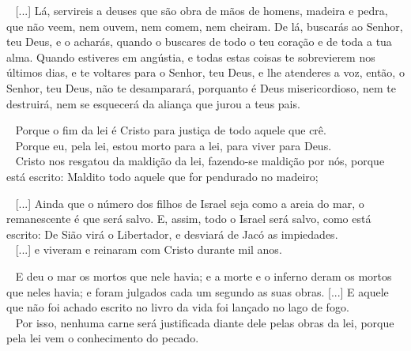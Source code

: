 \documentclass[12pt,aspectratio=169]{beamer}
\newcommand{\ver}[1]{%
    \raisebox{0.50ex}{%
        \scalebox{1.1}{%
            \pmb{\textbf{\textcolor{BSpbg}{#1}}}%
        }%
    }%
}
\newcommand{\QUOTE}[1]{%
    \par\noindent\hspace*{0.1\linewidth}%
    \begin{minipage}{0.8\linewidth}%
        \linespread{1.35}\large{#1}%
    \end{minipage}%
}
\newcommand{\WIDEQUOTE}[1]{%
    \par\noindent\hspace*{0.02\linewidth}%
    \begin{minipage}{0.92\linewidth}%
        \linespread{1.25}\large{#1}%
    \end{minipage}%
}
\newcommand{\RED}[1]{{\textcolor{TXred}{#1}}}
\newcommand{\YEL}[1]{{\textcolor{TXyel}{#1}}}
\newcommand{\GRE}[1]{{\textcolor{TXgre}{#1}}}
\newcommand{\CYA}[1]{{\textcolor{TXcya}{#1}}}
\newcommand{\MAG}[1]{{\textcolor{TXmag}{#1}}}
\newcommand{\BRI}[1]{{\textcolor{BSpbg}{#1}}}   %
\begin{document}
    \begin{frame}
        \WIDEQUOTE{%
            \ver{(ARC) Dt~4.25--31}~%
            [...] Lá, \RED{servireis a deuses que são obra de  mãos  de  homens,  madeira  e
            pedra}, que não veem, nem ouvem, nem comem, nem cheiram. \CYA{De lá, buscarás ao
            Senhor, teu Deus}, e \GRE{o acharás, quando o buscares de todo o teu  coração  e
            de toda a tua alma}. Quando estiveres \BRI{em angústia, e todas estas coisas  te
            sobrevierem} \MAG{nos últimos dias}, e te \CYA{voltares para o Senhor, teu Deus,
            e lhe atenderes a voz}, então, \GRE{o Senhor,  teu  Deus,  não  te  desamparará,
            porquanto é Deus misericordioso, nem te destruirá, nem se esquecerá  da  aliança
            que jurou a teus pais}.
        }
    \end{frame}

    \begin{frame}
        \QUOTE{%
            \ver{(ARC) Rm~10.4}~%
            Porque \MAG{o fim da lei é Cristo} para justiça de todo aquele que crê.
            \\[\medskipamount]
            \ver{(ARC) Gl~2.19}~%
            Porque eu, pela lei, \MAG{estou morto para a lei}, para viver para Deus.
            \\[\medskipamount]
            \ver{(ARC) Gl~3.13}~%
            \MAG{Cristo nos resgatou da maldição  da  lei},  fazendo-se  maldição  por  nós,
            porque está escrito: Maldito todo aquele que for pendurado no madeiro;
        }
    \end{frame}

    \begin{frame}
        \QUOTE{%
            \ver{(ARC) Rm~9.27;~11.26}~%
            [...] Ainda que o número dos filhos de \YEL{Israel} seja como a  areia  do  mar,
            \CYA{o remanescente é que será salvo}. E, assim, \MAG{todo o Israel será salvo},
            como está escrito: \YEL{De Sião  virá  o  Libertador,  e  desviará  de  Jacó  as
            impiedades}.
            \\[\medskipamount]
            \ver{(ARC) Ap~20.4}~%
            [...] e viveram e \MAG{reinaram com Cristo durante mil anos}.
        }
    \end{frame}

    \begin{frame}
        \QUOTE{%
            \ver{(ARC) Ap~20.13,15}~%
            E deu o mar os mortos que nele havia; e a morte e o inferno deram os mortos  que
            neles havia; \RED{e foram julgados cada um  segundo  as  suas  obras}.  [...]  E
            aquele que não foi achado escrito no livro da vida \RED{foi lançado no  lago  de
            fogo}.
            \\[\medskipamount]
            \ver{(ARC) Rm~3.20}~%
            Por isso, \RED{nenhuma carne será justificada diante dele pelas obras  da  lei},
            porque pela lei vem o conhecimento do pecado.
        }
    \end{frame}
\end{document}
